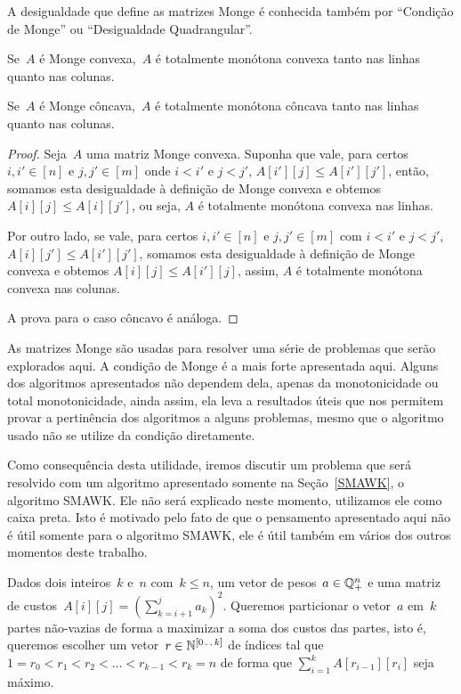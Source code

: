 A desigualdade que define as matrizes Monge é conhecida também por ``Condição de Monge'' ou ``Desigualdade Quadrangular''\cite{Yao:1980}\cite{Bein:2009}.

\begin{lema}
Se~$A$ é Monge convexa,~$A$ é totalmente monótona convexa tanto nas linhas quanto nas colunas.  

Se~$A$ é Monge côncava,~$A$ é totalmente monótona côncava tanto nas linhas quanto nas colunas.
\end{lema}

\begin{proof}
Seja~$A$ uma matriz Monge convexa. Suponha que vale, para certos $i,i' \in [n]$ e $j,j' \in [m]$ onde $i < i'$ e $j < j'$, $A[i'][j] \leq A[i'][j']$, então, somamos esta desigualdade à definição de Monge convexa e obtemos $A[i][j] \leq A[i][j']$, ou seja, $A$ é totalmente monótona convexa nas linhas.  

Por outro lado, se vale, para certos $i,i' \in [n]$ e $j,j' \in [m]$ com $i < i'$ e $j < j'$, $A[i][j'] \leq A[i'][j']$, somamos esta desigualdade à definição de Monge convexa e obtemos $A[i][j] \leq A[i'][j]$, assim, $A$ é totalmente monótona convexa nas colunas.  

A prova para o caso côncavo é análoga.
\end{proof}

As matrizes Monge são usadas para resolver uma série de problemas que serão explorados aqui. A condição de Monge é a mais forte apresentada aqui. Alguns dos algoritmos apresentados não dependem dela, apenas da monotonicidade ou total monotonicidade, ainda assim, ela leva a resultados úteis que nos permitem provar a pertinência dos algoritmos a alguns problemas, mesmo que o algoritmo usado não se utilize da condição diretamente.  

Como consequência desta utilidade, iremos discutir um problema que será resolvido com um algoritmo apresentado somente na Seção~\ref{SMAWK}, o algoritmo SMAWK. Ele não será explicado neste momento, utilizamos ele como caixa preta. Isto é motivado pelo fato de que o pensamento apresentado aqui não é útil somente para o algoritmo SMAWK, ele é útil também em vários dos outros momentos deste trabalho.  

\begin{prob} \label{prob:Monge_ex}
Dados dois inteiros~$k$ e~$n$ com~$k \leq n$, um vetor de pesos~$a \in \mathbb{Q}_+^n$ e uma matriz de custos~${A[i][j] = \left(\sum\limits_{k=i+1}^{j} a_k\right)^2}$. Queremos particionar o vetor~$a$ em~$k$ partes não-vazias de forma a maximizar a soma dos custos das partes, isto é, queremos escolher um vetor~${r \in \mathbb{N}^{[0 \,.\,.\, k]}}$ de índices tal que~${1 = r_0 < r_1 < r_2 < \dots < r_{k-1} < r_k = n}$ de forma que $\sum\limits_{i=1}^{k} A[r_{i-1}][r_i]$ seja máximo.
\end{prob}

